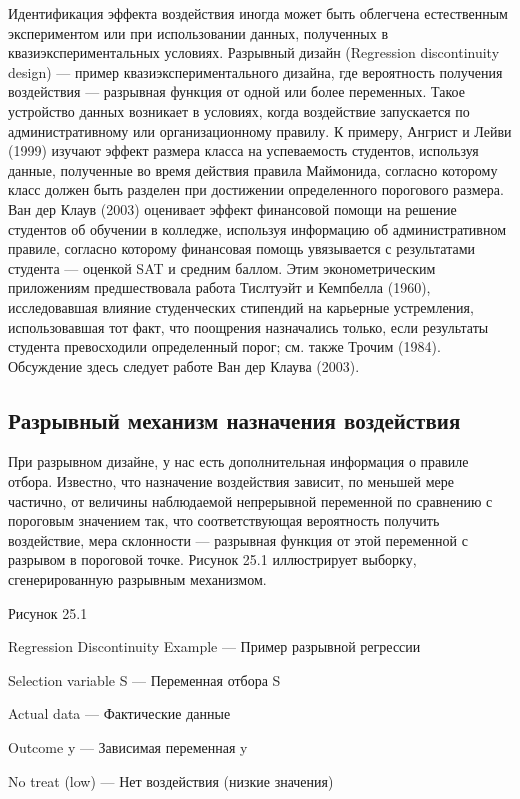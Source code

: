 Идентификация эффекта воздействия иногда может быть облегчена естественным экспериментом или при использовании данных, полученных в квазиэкспериментальных условиях. Разрывный дизайн (Regression discontinuity design) --- пример квазиэкспериментального дизайна, где вероятность получения воздействия --- разрывная функция от одной или более переменных. Такое устройство данных возникает в условиях, когда воздействие запускается по административному или организационному правилу. К примеру, Ангрист и Лейви (1999) изучают эффект размера класса на успеваемость студентов, используя данные, полученные во время действия правила Маймонида, согласно которому класс должен быть разделен при достижении определенного порогового размера. Ван дер Клаув (2003) оценивает эффект финансовой помощи на решение студентов об обучении в колледже, используя информацию об административном правиле, согласно которому финансовая помощь увязывается с результатами студента --- оценкой SAT и средним баллом. Этим эконометрическим приложениям предшествовала работа Тислтуэйт и Кемпбелла (1960), исследовавшая влияние студенческих стипендий на карьерные устремления, использовавшая тот факт, что поощрения назначались только, если результаты студента превосходили определенный порог; см. также Трочим (1984). Обсуждение здесь следует  работе Ван дер Клаува (2003).

\subsection{Разрывный механизм назначения воздействия}

При разрывном дизайне, у нас есть дополнительная информация о правиле отбора. Известно, что назначение воздействия зависит, по меньшей мере частично, от величины наблюдаемой непрерывной переменной по сравнению с пороговым значением так, что соответствующая вероятность получить воздействие, мера склонности --- разрывная функция от этой переменной с разрывом в пороговой точке. Рисунок 25.1 иллюстрирует выборку, сгенерированную разрывным механизмом. 

\vspace{3cm}
Рисунок 25.1

Regression Discontinuity Example --- Пример разрывной регрессии

Selection variable S --- Переменная отбора S

Actual data --- Фактические данные

Outcome y --- Зависимая переменная y

No treat (low) --- Нет воздействия (низкие значения)

